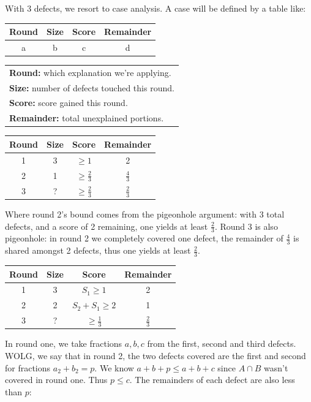With 3 defects, we resort to case analysis.  A case will be defined by a table like:

\begin{tabular}{cccc}\hline
Round & Size & Score & Remainder \\ \hline
a & b & c & d \\
\end{tabular}

\begin{tabular}{l}
{\bf Round:} which explanation we're applying. \\
{\bf Size:} number of defects touched this round.  \\
{\bf Score:} score gained this round.  \\
{\bf Remainder:} total unexplained portions. \\
\end{tabular}

\begin{tabular}{cccc}\hline
Round & Size & Score & Remainder \\ \hline
1 & 3 & $\geq 1$ & 2 \\
2 & 1 & $\geq \frac23$ & $\frac43$ \\
3 & ? & $\geq \frac23$ & $\frac23$ \\
\end{tabular}

Where round 2's bound comes from the pigeonhole argument: with 3 total defects, and a score of 2 remaining, one yields at least $\frac23$.  Round 3 is also pigeonhole: in round 2 we completely covered one defect, the remainder of $\frac43$ is shared amongst 2 defects, thus one yields at least $\frac23$.

\begin{tabular}{cccc}\hline
Round & Size & Score & Remainder \\ \hline
1 & 3 & $S_1 \geq 1$ & 2 \\
2 & 2 & $S_2 + S_1 \geq 2$ & 1 \\
3 & ? & $\geq \frac13$ & $\frac23$ \\
\end{tabular}

In round one, we take fractions ${a,b,c}$ from the first, second and third defects.  WOLG, we say that in round 2, the two defects covered are the first and second for fractions $a_2 + b_2 = p$.  We know $a + b + p \leq a + b + c$ since $A \cap B$ wasn't covered in round one.  Thus $p \leq c$.  The remainders of each defect are also less than $p$: 

